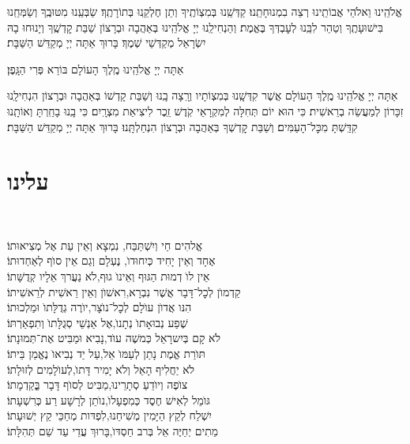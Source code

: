 \documentclass[twoside, openany, parskip=half, 11pt]{book}
\begin{document}
אֱלֹהֵֽינוּ וֵאלֹהֵי אֲבוֹתֵֽינוּ רְצֵה בִמְנוּחָתֵֽנוּ׃ קַדְּשֵֽׁנוּ בְּמִצְוֹתֶֽיךָ וְתֵן חֶלְקֵֽנוּ בְּתוֹרָתֶֽךָ׃ שַׂבְּעֵֽנוּ מִטּוּבֶֽךָ וְשַׂמְּחֵֽנוּ בִּישׁוּעָתֶֽךָ וְטַהֵר לִבֵּֽנוּ לְעׇבְדְּךָ בֶּאֱמֶת׃ וְהַנְחִילֵֽנוּ יְיָ אֱלֹהֵֽינוּ בְּאַהֲבָה וּבְרָצוֹן שַׁבַּת קׇדְשֶֽׁךָ וְיָנוּחוּ בָהּ יִשְׂרָאֵל מְקַדְּשֵׁי שְׁמֶךָ׃ בָּרוּךְ אַתָּה יְיָ מְקַדֵּשׁ הַשַּׁבָּת׃

\fullkaddish
\nextpage
{}

אַתָּה יְיָ אֱלֹהֵֽינוּ מֶֽלֶךְ הָעוֹלָם בּוֹרֵא פְּרִי הַגָּֽפֶן׃

אַתָּה יְיָ אֱלֹהֵֽינוּ מֶֽלֶךְ הָעוֹלָם אֲשֶׁר קִדְּשָֽׁנוּ בְּמִצְוֹתָיו וְרָֽצָה בָֽנוּ וְשַׁבַּת קָדְשׁוֹ בְּאַהֲבָה וּבְרָצוֹן הִנְחִילָֽנוּ זִכָּרוֹן לְמַעֲשֵׂה בְרֵאשִׁית׃ כִּי הוּא יוֹם תְּחִלָּה לְמִקְרָאֵי קֹֽדֶשׁ זֵֽכֶר לִיצִיאַת מִצְרָֽיִם׃ כִּי בָֽנוּ בָחַֽרְתָּ וְאוֹתָֽנוּ קִדַּֽשְׁתָּ מִכׇּל־הָעַמִּים׃ וְשַׁבַּת קׇדְשְׁךָ בְּאַהֲבָה וּבְרָצוֹן הִנְחַלְתָּֽנוּ׃ בָּרוּךְ אַתָּה יְיָ מְקַדֵּשׁ הַשַּׁבָּת׃



\section*{ עלינו }
\aleinu

\ledavid
\\
\mournerskaddish
\nextpage
{}



אֱלהִים חַי וְיִשְׁתַּבַּח, \hfill נִמְצָא וְאֵין עֵת אֶל מְצִיאוּתוֹ׃ \\
אֶחָד וְאֵין יָחִיד כְּיִחוּדוׂ, \hfill נֶעְלָם וְגַם אֵין סוׂף לְאַחְדוּתוֹ׃ \\
אֵין לוׂ דְמוּת הַגּוּף וְאֵינוׂ גוּף,\hfill לׂא נַעֲרךְ אֵלָיו קְדֻשָּׁתוֹ׃ \\
קַדְמוׂן לְכׇל־דָּבָר אֲשֶׁר נִבְרָא,\hfill רִאשׁוׂן וְאֵין רֵאשִׁית לְרֵאשִׁיתוֹ׃ \\
הִנּו אֲדוׂן עוׂלָם לְכׇל־נוׂצָר,\hfill יוׂרֶה גְדֻלָּתוׂ וּמַלְכוּתוֹ׃ \\
שֶׁפַע נְבוּאָתוׂ נְתָנוׂ,\hfill אֶל אַנְשֵׁי סְגֻלָּתוׂ וְתִפְאַרְתּוֹ׃ \\
לׂא קָם בְּיִשרָאֵל כְּמשֶׁה עוׂד,\hfill נָבִיא וּמַבִּיט אֶת־תְּמוּנָתוֹ׃ \\
תּוׂרַת אֱמֶת נָתַן לְעַמּוׂ אֵל,\hfill עַל יַד נְבִיאוׂ נֶאֱמַן בֵּיתוֹ׃ \\
לׂא יַחֲלִיף הָאֵל וְלׂא יָמִיר דָּתוׂ,\hfill לְעוׂלָמִים לְזוּלָתוֹ׃ \\
צוׂפֶה וְיוׂדֵעַ סְתָרֵינוּ,\hfill מַבִּיט לְסוׂף דָּבָר בְְַּקַדְמָתוֹ׃ \\
גּוׂמֵל לְאִישׁ חֶסֶד כְּמִפְעָלוׂ,\hfill נוׂתֵן לְרָשָׁע רַע כְּרִשְׁעָתוֹ׃ \\
יִשְׁלַח לְקֵץ הַיָּמִין מְשִׁיחֵנוּ,\hfill לִפְדּות מְחַכֵּי קֵץ יְשׁוּעָתוֹ׃ \\
מֵתִים יְחַיֶּה אֵל בְּרב חַסְדּוׂ,\hfill בָּרוּךְ עֲדֵי עַד שֵׁם תְּהִלָּתוֹ׃\\
\end{document}
